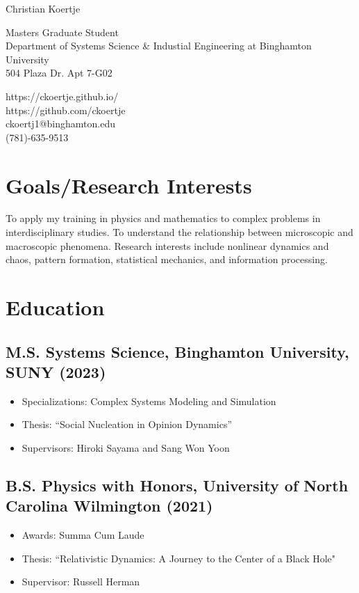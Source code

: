 \documentclass[12pt]{article}
\begin{document}
{\Huge Christian Koertje}

\begin{multicols}{2}
    Masters Graduate Student \\
    Department of Systems Science \& Industial Engineering at Binghamton University \\
    504 Plaza Dr. Apt 7-G02

    \columnbreak
    https://ckoertje.github.io/ \\
    https://github.com/ckoertje \\
    ckoertj1@binghamton.edu \\
    (781)-635-9513
\end{multicols}

\section{Goals/Research Interests}
To apply my training in physics and mathematics to complex problems in interdisciplinary studies. To understand the relationship between microscopic and macroscopic phenomena. Research interests include nonlinear dynamics and chaos, pattern formation, statistical mechanics, and information processing.

\section{Education}
\subsection{\textbf{M.S. Systems Science}, Binghamton University, SUNY \hfill (2023)}
\begin{itemize}
    \itemsep = 0em
    \item[] Specializations: Complex Systems Modeling and Simulation
    \item[] Thesis: ``Social Nucleation in Opinion Dynamics''
    \item[] Supervisors: Hiroki Sayama and Sang Won Yoon
\end{itemize}

\subsection{\textbf{B.S. Physics with Honors}, University of North Carolina Wilmington \hfill (2021)}
\begin{itemize}
    \itemsep = 0em
    \item[] Awards: Summa Cum Laude
    \item[] Thesis: ``Relativistic Dynamics: A Journey to the Center of a Black Hole"
    \item[] Supervisor: Russell Herman
\end{itemize}
\end{document}
